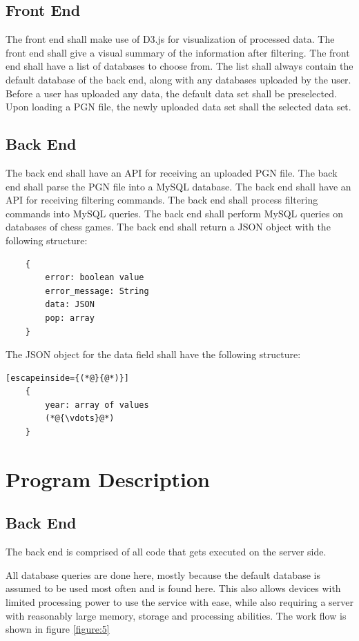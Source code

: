 \documentclass{article}
\begin{document}
\subsection{Front End}
The front end shall make use of D3.js for visualization of processed data.
The front end shall give a visual summary of the information after filtering.
The front end shall have a list of databases to choose from.  The list
shall always contain the default database of the back end, along
with any databases uploaded by the user.
Before a user has uploaded any data, the default data set \cite{def_db} shall
be preselected.
Upon loading a PGN file, the newly uploaded data set shall the selected
data set.

\subsection{Back End}
The back end shall have an API for receiving an uploaded PGN file.
The back end shall parse the PGN file into a MySQL database.
The back end shall have an API for receiving filtering commands.
The back end shall process filtering commands into MySQL queries.
The back end shall perform MySQL queries on databases of chess games.
The back end shall return a JSON object with the following structure:
\begin{lstlisting}
	{
		error: boolean value
		error_message: String
		data: JSON
		pop: array
	}
\end{lstlisting}
The JSON object for the data field shall have the following structure:
\begin{lstlisting}[escapeinside={(*@}{@*)}]
	{
		year: array of values
		(*@{\vdots}@*)
	}
\end{lstlisting}

\section{Program Description}

\subsection{Back End}
The back end is comprised of all code that gets executed on the server side.

All database queries are done here, mostly because the default database is
assumed to be used most often and is found here. This also allows devices
with limited processing power to use the service with ease, while also
requiring a server with reasonably large memory, storage and
processing abilities. The work flow is shown in figure \ref{figure:5}
\end{document}
